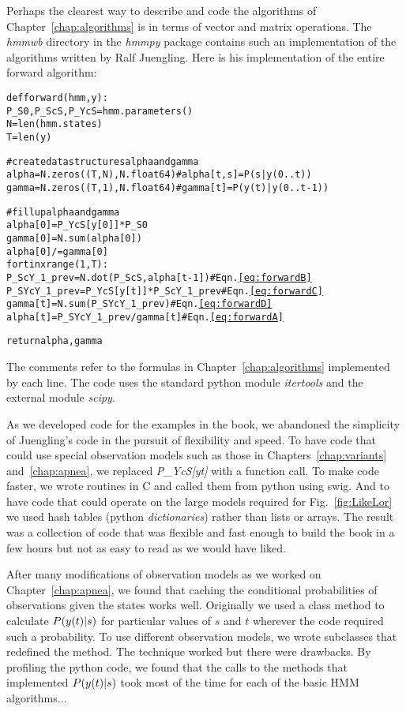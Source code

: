 Perhaps the clearest way to describe and code the algorithms of
Chapter~\ref{chap:algorithms} is in terms of vector and matrix
operations.  The \emph{hmmwb} directory in the \emph{hmmpy} package
contains such an implementation of the algorithms written by Ralf
Juengling.   Here is his implementation of the
entire forward algorithm:
\begin{alltt}
% ToDo: ?
def forward(hmm, y):
    P_S0, P_ScS, P_YcS = hmm.parameters()
    N = len(hmm.states)
    T = len(y)

    # create data structures alpha and gamma
    alpha = N.zeros((T, N), N.float64) # alpha[t,s] = P(s|y(0..t))
    gamma = N.zeros((T, 1), N.float64) # gamma[t] = P(y(t)|y(0..t-1))

    # fill up alpha and gamma
    alpha[0] = P_YcS[y[0]]*P_S0
    gamma[0] = N.sum(alpha[0])
    alpha[0] /= gamma[0]
    for t in xrange(1, T):
        P_ScY_1_prev = N.dot(P_ScS, alpha[t-1])    # Eqn. \eqref{eq:forwardB}
        P_SYcY_1_prev = P_YcS[y[t]]*P_ScY_1_prev   # Eqn. \eqref{eq:forwardC}
        gamma[t] = N.sum(P_SYcY_1_prev)            # Eqn. \eqref{eq:forwardD}
        alpha[t] = P_SYcY_1_prev/gamma[t]          # Eqn. \eqref{eq:forwardA}

    return alpha, gamma
\end{alltt}

The comments refer to the formulas in Chapter~\ref{chap:algorithms}
implemented by each line.  The code uses the standard python module
\emph{itertools} and the external module \emph{scipy}.

As we developed code for the examples in the book, we abandoned the
simplicity of Juengling's code in the pursuit of flexibility and
speed.  To have code that could use special observation models such as
those in Chapters~\ref{chap:variants} and~\ref{chap:apnea}, we
replaced \emph{P\_YcS[yt]} with a function call.  To make code faster,
we wrote routines in C and called them from python using swig.  And to
have code that could operate on the large models required for
Fig.~\ref{fig:LikeLor} we used hash tables (python
\emph{dictionaries}) rather than lists or arrays.  The result was a
collection of code that was flexible and fast enough to build the book
in a few hours but not as easy to read as we would have liked.

After many modifications of observation models as we worked on
Chapter~\ref{chap:apnea}, we found that caching the conditional
probabilities of observations given the states works well.  Originally
we used a class method to calculate $P({y}{(t)}|s)$ for particular
values of $s$ and $t$ wherever the code required such a probability.
To use different observation models, we wrote subclasses that
redefined the method.  The technique worked but there were drawbacks.
By profiling the python code, we found that the calls to the methods
that implemented $P({y}{(t)}|s)$ took most of the time for each of
the basic HMM algorithms$\ldots$

